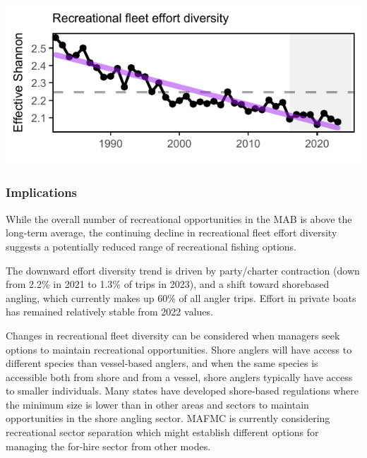 \documentclass[
  10pt,
]{article}
\let\origfigure\figure
\let\endorigfigure\endfigure
\renewenvironment{figure}[1][2] {
    \expandafter\origfigure\expandafter[H]
} {
    \endorigfigure
}
\begin{document}
\begin{figure}

{\centering \includegraphics{midatlantic_files/figure-latex/rec-div-1} 

}

\caption{Recreational fleet effort diversity (black) in the Mid-Atlantic, with significant decrease (purple line).}\label{fig:rec-div}
\end{figure}

\subsubsection{Implications}\label{implications-2}

While the overall number of recreational opportunities in the MAB is above the long-term average, the continuing decline in recreational fleet effort diversity suggests a potentially reduced range of recreational fishing options.

The downward effort diversity trend is driven by party/charter contraction (down from 2.2\% in 2021 to 1.3\% of trips in 2023), and a shift toward shorebased angling, which currently makes up 60\% of all angler trips. Effort in private boats has remained relatively stable from 2022 values.

Changes in recreational fleet diversity can be considered when managers seek options to maintain recreational opportunities. Shore anglers will have access to different species than vessel-based anglers, and when the same species is accessible both from shore and from a vessel, shore anglers typically have access to smaller individuals. Many states have developed shore-based regulations where the minimum size is lower than in other areas and sectors to maintain opportunities in the shore angling sector. MAFMC is currently considering recreational sector separation which might establish different options for managing the for-hire sector from other modes.
\end{document}
